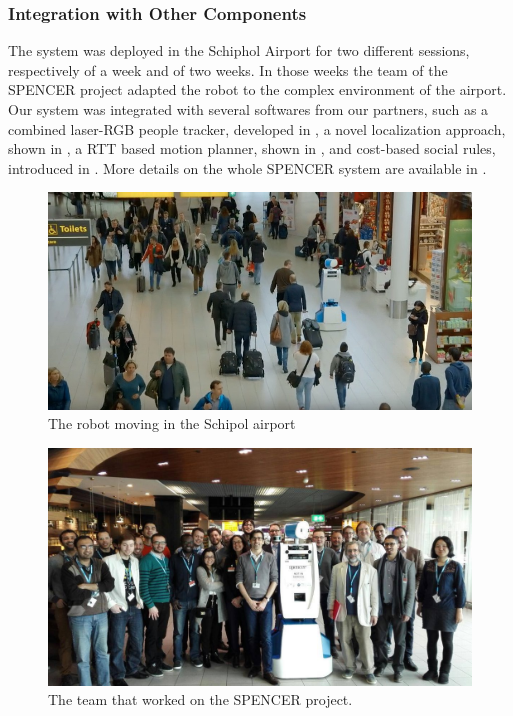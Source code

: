 \subsubsection{Integration with Other Components}
The system was deployed in the Schiphol Airport for two different sessions, respectively of a week and of two weeks. In those weeks the team of the SPENCER project adapted the robot to the complex environment of the airport. Our system was integrated with several softwares from our partners, such as a combined laser-RGB people tracker, developed in \cite{lindermulti}, a novel localization approach, shown in \cite{kucner2015ndt}, a RTT based motion planner, shown in \cite{palmierirrt}, and cost-based social rules, introduced in \cite{okallearning}. More details on the whole SPENCER system are available in \cite{triebel2015spencer}.


\begin{figure}[ht!]
	\centering
	\includegraphics[scale=0.45]{img/case_study/spencer/spencer_schiphol.png}
	\caption{The robot moving in the Schipol airport}
	\label{fig:case_study-spencer-spencer_moving}
\end{figure}


\begin{figure}[ht!]
	\centering
	\includegraphics[scale=0.45]{img/case_study/spencer/all.jpg}
	\caption{The team that worked on the SPENCER project.}
	\label{fig:case_study-spencer-team}
\end{figure}

